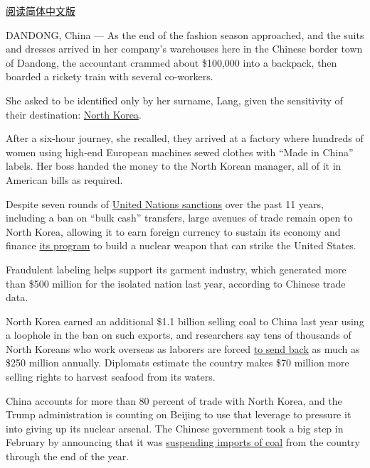 \href{https://cn.nytimes3xbfgragh.onion/asia-pacific/20170515/north-korea-sanctions-loopholes-china-united-states-garment-industry/}{阅读简体中文版}

DANDONG, China --- As the end of the fashion season approached, and the
suits and dresses arrived in her company's warehouses here in the
Chinese border town of Dandong, the accountant crammed about \$100,000
into a backpack, then boarded a rickety train with several co-workers.

She asked to be identified only by her surname, Lang, given the
sensitivity of their destination:
\href{https://www.nytimes3xbfgragh.onion/topic/destination/north-korea?8qa}{North
Korea}.

After a six-hour journey, she recalled, they arrived at a factory where
hundreds of women using high-end European machines sewed clothes with
``Made in China'' labels. Her boss handed the money to the North Korean
manager, all of it in American bills as required.

Despite seven rounds of
\href{https://www.nytimes3xbfgragh.onion/2016/11/30/world/asia/north-korea-un-sanctions.html}{United
Nations sanctions} over the past 11 years, including a ban on ``bulk
cash'' transfers, large avenues of trade remain open to North Korea,
allowing it to earn foreign currency to sustain its economy and finance
\href{https://www.nytimes3xbfgragh.onion/topic/subject/north-koreas-nuclear-program?8qa}{its
program} to build a nuclear weapon that can strike the United States.

Fraudulent labeling helps support its garment industry, which generated
more than \$500 million for the isolated nation last year, according to
Chinese trade data.

North Korea earned an additional \$1.1 billion selling coal to China
last year using a loophole in the ban on such exports, and researchers
say tens of thousands of North Koreans who work overseas as laborers are
forced
\href{https://www.nytimes3xbfgragh.onion/2015/02/20/world/asia/north-koreans-toil-in-slavelike-conditions-abroad-rights-groups-say.html}{to
send back} as much as \$250 million annually. Diplomats estimate the
country makes \$70 million more selling rights to harvest seafood from
its waters.

China accounts for more than 80 percent of trade with North Korea, and
the Trump administration is counting on Beijing to use that leverage to
pressure it into giving up its nuclear arsenal. The Chinese government
took a big step in February by announcing that it was
\href{https://www.nytimes3xbfgragh.onion/2017/02/18/world/asia/north-korea-china-coal-imports-suspended.html}{suspending
imports of coal} from the country through the end of the year.

